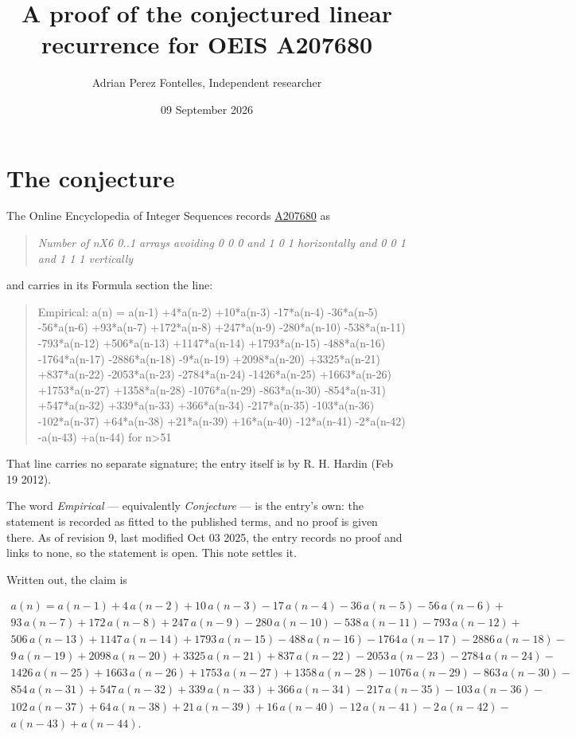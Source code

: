 \documentclass[11pt]{article}
\title{A proof of the conjectured linear recurrence for OEIS A207680}
\author{Adrian Perez Fontelles, Independent researcher}
\date{09 September 2026}
\theoremstyle{definition}
\begin{document}
\maketitle
\section{The conjecture}

The Online Encyclopedia of Integer Sequences records \href{https://oeis.org/A207680}{A207680} as

\begin{quote}\itshape Number of nX6 0..1 arrays avoiding 0 0 0 and 1 0 1 horizontally and 0 0 1 and 1 1 1 vertically\end{quote}

and carries in its Formula section the line:

\begin{quote}\ttfamily Empirical: a(n) = a(n-1) +4*a(n-2) +10*a(n-3) -17*a(n-4) -36*a(n-5) -56*a(n-6) +93*a(n-7) +172*a(n-8) +247*a(n-9) -280*a(n-10) -538*a(n-11) -793*a(n-12) +506*a(n-13) +1147*a(n-14) +1793*a(n-15) -488*a(n-16) -1764*a(n-17) -2886*a(n-18) -9*a(n-19) +2098*a(n-20) +3325*a(n-21) +837*a(n-22) -2053*a(n-23) -2784*a(n-24) -1426*a(n-25) +1663*a(n-26) +1753*a(n-27) +1358*a(n-28) -1076*a(n-29) -863*a(n-30) -854*a(n-31) +547*a(n-32) +339*a(n-33) +366*a(n-34) -217*a(n-35) -103*a(n-36) -102*a(n-37) +64*a(n-38) +21*a(n-39) +16*a(n-40) -12*a(n-41) -2*a(n-42) -a(n-43) +a(n-44) for n>51\end{quote}

That line carries no separate signature; the entry itself is by R. H. Hardin (Feb 19 2012).

The word {\itshape Empirical} --- equivalently {\itshape Conjecture} --- is the entry's own: the statement is recorded as fitted to the published terms, and no proof is given there. As of revision 9, last modified Oct 03 2025, the entry records no proof and links to none, so the statement is open. This note settles it.

Written out, the claim is

\begin{multline*} a(n) = a(n-1) + 4\,a(n-2) + 10\,a(n-3) - 17\,a(n-4) - 36\,a(n-5) - 56\,a(n-6) + \\ 93\,a(n-7) + 172\,a(n-8) + 247\,a(n-9) - 280\,a(n-10) - 538\,a(n-11) - 793\,a(n-12) + \\ 506\,a(n-13) + 1147\,a(n-14) + 1793\,a(n-15) - 488\,a(n-16) - 1764\,a(n-17) - 2886\,a(n-18) - \\ 9\,a(n-19) + 2098\,a(n-20) + 3325\,a(n-21) + 837\,a(n-22) - 2053\,a(n-23) - 2784\,a(n-24) - \\ 1426\,a(n-25) + 1663\,a(n-26) + 1753\,a(n-27) + 1358\,a(n-28) - 1076\,a(n-29) - 863\,a(n-30) - \\ 854\,a(n-31) + 547\,a(n-32) + 339\,a(n-33) + 366\,a(n-34) - 217\,a(n-35) - 103\,a(n-36) - \\ 102\,a(n-37) + 64\,a(n-38) + 21\,a(n-39) + 16\,a(n-40) - 12\,a(n-41) - 2\,a(n-42) - \\ a(n-43) + a(n-44). \end{multline*}
\end{document}
